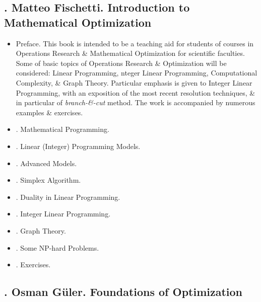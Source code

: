 \documentclass{article}
\begin{document}

\subsection{\cite{Fischetti2019}. {\sc Matteo Fischetti}. Introduction to Mathematical Optimization}

\begin{itemize}
    \item {\sf Preface.} This book is intended to be a teaching aid for students of courses in Operations Research \& Mathematical Optimization for scientific faculties. Some of basic topics of Operations Research \& Optimization will be considered: Linear Programming, nteger Linear Programming, Computational Complexity, \& Graph Theory. Particular emphasis is given to Integer Linear Programming, with an exposition of the most recent resolution techniques, \& in particular of {\it branch-\&-cut} method. The work is accompanied by numerous examples \& exercises.
    \item {. Mathematical Programming.}
    \item {. Linear (Integer) Programming Models.}
    \item {. Advanced Models.}
    \item {. Simplex Algorithm.}
    \item {. Duality in Linear Programming.}
    \item {. Integer Linear Programming.}
    \item {. Graph Theory.}
    \item {. Some NP-hard Problems.}
    \item {. Exercises.}
\end{itemize}


\subsection{\cite{Gueler2010}. {\sc Osman G\"uler}. Foundations of Optimization}
\end{document}
